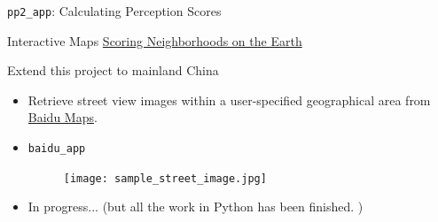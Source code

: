 \documentclass{beamer}
\begin{document}
\begin{frame}{\texttt{pp2_app}: Calculating Perception Scores}
    \begin{center}
\end{center}
\end{frame}

\begin{frame}{Interactive Maps}
\href{https://luxin-tian.github.io/Scoring-Neighborhoods-on-the-Earth/}{Scoring Neighborhoods on the Earth}
    \begin{center}
    \end{center}
\end{frame}

\begin{frame}{Extend this project to mainland China}

\begin{itemize}
    \item Retrieve street view images within a user-specified geographical area from \href{http://lbsyun.baidu.com/}{Baidu Maps}. 
    \item \texttt{baidu_app}
    
        \begin{center}
            \begin{figure}
            \texttt{[image: sample\_street\_image.jpg]}
            \centering
        \end{figure}
    \end{center}
    
    \item In progress... (but all the work in Python has been finished. )
    
\end{itemize}

\end{frame}
\end{document}
